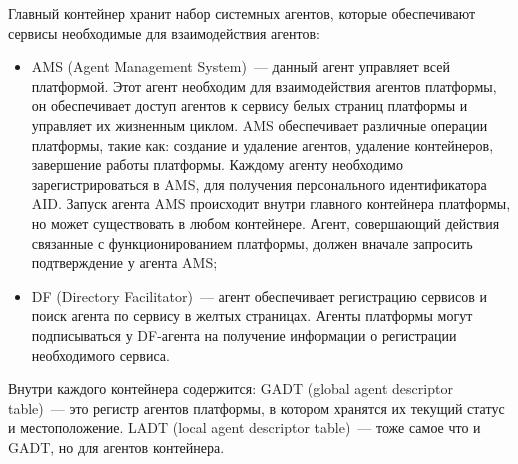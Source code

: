 Главный контейнер хранит набор системных агентов, которые обеспечивают сервисы необходимые для взаимодействия агентов:
\begin{itemize}
\item AMS (Agent Management System)~--- данный агент управляет всей платформой. Этот агент необходим для взаимодействия агентов платформы, он обеспечивает доступ агентов к сервису белых страниц платформы и управляет их жизненным циклом. AMS обеспечивает различные операции платформы, такие как: создание и удаление агентов, удаление контейнеров, завершение работы платформы. Каждому агенту необходимо зарегистрироваться в AMS, для получения персонального идентификатора AID. Запуск агента AMS происходит внутри главного контейнера платформы, но может существовать в любом контейнере. Агент, совершающий действия связанные с функционированием платформы, должен вначале запросить подтверждение у агента AMS;
\item DF (Directory Facilitator)~--- агент обеспечивает регистрацию сервисов и поиск агента по сервису в желтых страницах. Агенты платформы могут подписываться у DF-агента на получение информации о регистрации необходимого сервиса.
\end{itemize}

Внутри каждого контейнера содержится:
GADT (global agent descriptor table)~--- это регистр агентов платформы, в котором хранятся их текущий статус и местоположение.
LADT (local agent descriptor table)~--- тоже самое что и GADT, но для агентов контейнера.

